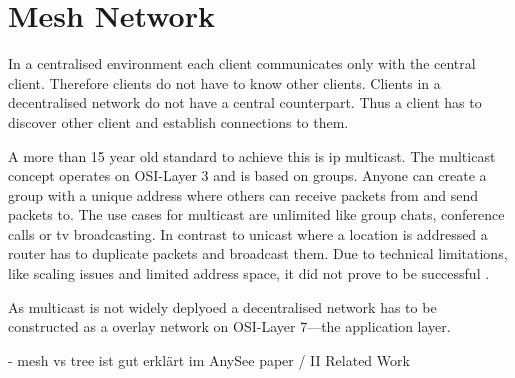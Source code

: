 \section{Mesh Network}
In a centralised environment each client communicates only with the central client. Therefore clients do not have to know other clients.
Clients in a decentralised network do not have a central counterpart. Thus a client has to discover other client and establish connections to them.

A more than 15 year old standard to achieve this is \gls{ip} multicast. The multicast concept operates on OSI-Layer 3 and is based on groups. Anyone can create a group with a unique address where others can receive packets from and send packets to. The use cases for multicast are unlimited like group chats, conference calls or tv broadcasting.
In contrast to unicast where a location is addressed a router has to duplicate packets and broadcast them. 
Due to technical limitations, like scaling issues and limited address space, it did not prove to be successful \cite{multicast}.

As multicast is not widely deplyoed a decentralised network has to be constructed as a overlay network on OSI-Layer 7—the application layer.

- mesh vs tree ist gut erklärt im AnySee paper / II Related Work